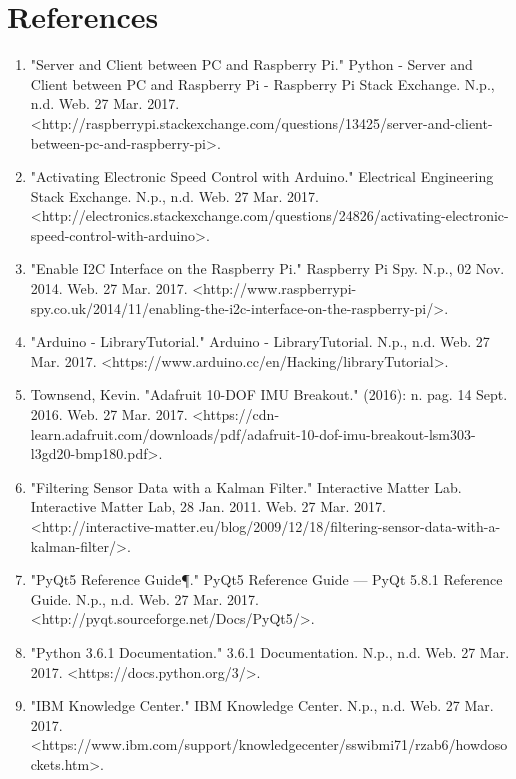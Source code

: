 \section{References}

\begin{enumerate}

\item "Server and Client between PC and Raspberry Pi." Python - Server and Client between PC and Raspberry Pi - Raspberry Pi Stack Exchange. N.p., n.d. Web. 27 Mar. 2017. <http://raspberrypi.stackexchange.com/questions/13425/server-and-client-between-pc-and-raspberry-pi>.

 \item "Activating Electronic Speed Control with Arduino." Electrical Engineering Stack Exchange. N.p., n.d. Web. 27 Mar. 2017. <http://electronics.stackexchange.com/questions/24826/activating-electronic-speed-control-with-arduino>.
 
 \item "Enable I2C Interface on the Raspberry Pi." Raspberry Pi Spy. N.p., 02 Nov. 2014. Web. 27 Mar. 2017. <http://www.raspberrypi-spy.co.uk/2014/11/enabling-the-i2c-interface-on-the-raspberry-pi/>.
 
 \item "Arduino - LibraryTutorial." Arduino - LibraryTutorial. N.p., n.d. Web. 27 Mar. 2017. <https://www.arduino.cc/en/Hacking/libraryTutorial>.
 
 \item Townsend, Kevin. "Adafruit 10-DOF IMU Breakout." (2016): n. pag. 14 Sept. 2016. Web. 27 Mar. 2017. <https://cdn-learn.adafruit.com/downloads/pdf/adafruit-10-dof-imu-breakout-lsm303-l3gd20-bmp180.pdf>.
 
 \item "Filtering Sensor Data with a Kalman Filter." Interactive Matter Lab. Interactive Matter Lab, 28 Jan. 2011. Web. 27 Mar. 2017. <http://interactive-matter.eu/blog/2009/12/18/filtering-sensor-data-with-a-kalman-filter/>.
 
 \item "PyQt5 Reference Guide¶." PyQt5 Reference Guide — PyQt 5.8.1 Reference Guide. N.p., n.d. Web. 27 Mar. 2017. <http://pyqt.sourceforge.net/Docs/PyQt5/>.
 
 \item "Python 3.6.1 Documentation." 3.6.1 Documentation. N.p., n.d. Web. 27 Mar. 2017. <https://docs.python.org/3/>.
 
 \item "IBM Knowledge Center." IBM Knowledge Center. N.p., n.d. Web. 27 Mar. 2017. <https://www.ibm.com/support/knowledgecenter/sswibmi71/rzab6/howdosockets.htm>.

\end{enumerate}